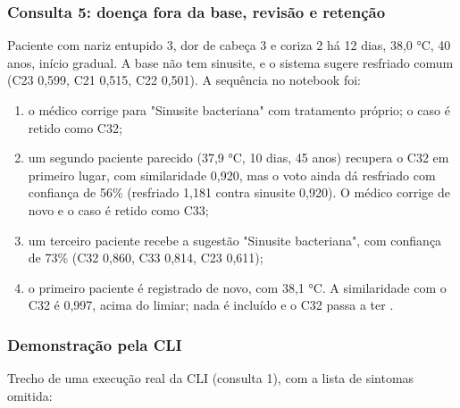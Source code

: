 \documentclass[12pt, a4paper]{article}
\providecommand{\tightlist}{%
  \setlength{\itemsep}{0pt}\setlength{\parskip}{0pt}}
\DeclareRobustCommand{\texttt}[1]{\breakabletexttt{#1}}
\begin{document}
\subsubsection{Consulta 5: doença fora da base, revisão e retenção}\label{consulta-5-doenuxe7a-fora-da-base-revisuxe3o-e-retenuxe7uxe3o}

Paciente com nariz entupido 3, dor de cabeça 3 e coriza 2 há 12 dias, 38,0 °C, 40 anos, início gradual. A base não tem sinusite, e o sistema sugere resfriado comum (C23 0,599, C21 0,515, C22 0,501). A sequência no notebook foi:

\begin{enumerate}
\def\labelenumi{\arabic{enumi}.}
\tightlist
\item
  o médico corrige para "Sinusite bacteriana" com tratamento próprio; o caso é retido como C32;
\item
  um segundo paciente parecido (37,9 °C, 10 dias, 45 anos) recupera o C32 em primeiro lugar, com similaridade 0,920, mas o voto ainda dá resfriado com confiança de 56\% (resfriado 1,181 contra sinusite 0,920). O médico corrige de novo e o caso é retido como C33;
\item
  um terceiro paciente recebe a sugestão "Sinusite bacteriana", com confiança de 73\% (C32 0,860, C33 0,814, C23 0,611);
\item
  o primeiro paciente é registrado de novo, com 38,1 °C. A similaridade com o C32 é 0,997, acima do limiar; nada é incluído e o C32 passa a ter \texttt{confirmacoes\ =\ 1}.
\end{enumerate}

\subsubsection{Demonstração pela CLI}\label{demonstrauxe7uxe3o-pela-cli}

Trecho de uma execução real da CLI (consulta 1), com a lista de sintomas omitida:
\end{document}
